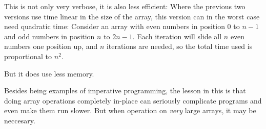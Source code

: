 \documentclass[a4paper]{article}
\begin{document}
\noindent
This is not only very verbose, it is also less efficient: Where the
previous two versions use time linear in the size of the array, this
version can in the worst case need quadratic time: Consider an array
with even numbers in position 0 to $n-1$ and odd numbers in position
$n$ to $2n-1$.  Each iteration will slide all $n$ even numbers one
position up, and $n$ iterations are needed, so the total time used is
proportional to $n^2$.

But it does use less memory.

Besides being examples of imperative programming, the lesson in this
is that doing array operations completely in-place can seriously
complicate programs and even make them run slower.  But when operation
on \emph{very} large arrays, it may be neccesary.
\end{document}
